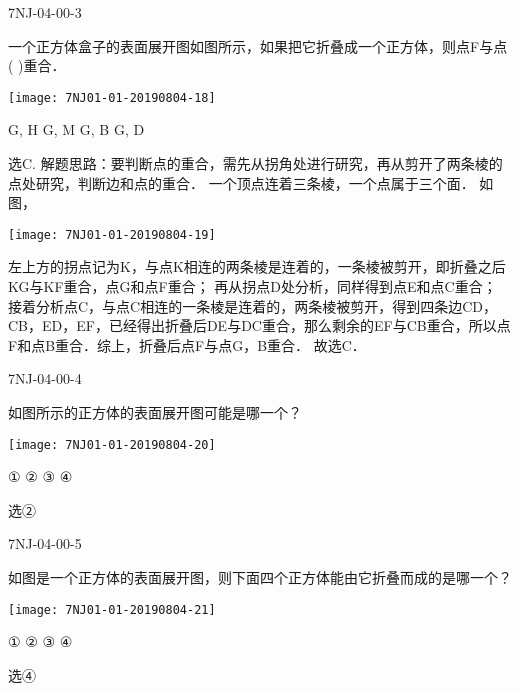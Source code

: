 \begin{defproblem}{7NJ-04-00-3}%
\begin{onlyproblem}%
一个正方体盒子的表面展开图如图所示，如果把它折叠成一个正方体，则点F与点(    )重合． 
\begin{center}
\texttt{[image: 7NJ01-01-20190804-18]}
\end{center}

\xx
{G, H}
{G, M}
{G, B}
{G, D}


\end{onlyproblem}%
\begin{onlysolution}%
\begin{solution}%
选C.
解题思路：要判断点的重合，需先从拐角处进行研究，再从剪开了两条棱的点处研究，判断边和点的重合． 一个顶点连着三条棱，一个点属于三个面． 如图， 
\begin{center}
\texttt{[image: 7NJ01-01-20190804-19]}
\end{center}

  左上方的拐点记为K，与点K相连的两条棱是连着的，一条棱被剪开，即折叠之后KG与KF重合，点G和点F重合； 再从拐点D处分析，同样得到点E和点C重合； 接着分析点C，与点C相连的一条棱是连着的，两条棱被剪开，得到四条边CD，CB，ED，EF，已经得出折叠后DE与DC重合，那么剩余的EF与CB重合，所以点F和点B重合．综上，折叠后点F与点G，B重合． 故选C． 
\end{solution}%
\end{onlysolution}%
\end{defproblem}


\begin{defproblem}{7NJ-04-00-4}%
\begin{onlyproblem}%
如图所示的正方体的表面展开图可能是哪一个？ 
\begin{center}
\texttt{[image: 7NJ01-01-20190804-20]}
\end{center}

\xx
{①}
{②}
{③}
{④}


\end{onlyproblem}%
\begin{onlysolution}%
\begin{solution}%
选②
\end{solution}%
\end{onlysolution}%
\end{defproblem}


\begin{defproblem}{7NJ-04-00-5}%
\begin{onlyproblem}%
如图是一个正方体的表面展开图，则下面四个正方体能由它折叠而成的是哪一个？ 
\begin{center}
\texttt{[image: 7NJ01-01-20190804-21]}
\end{center}

\xx
{①}
{②}
{③}
{④}


\end{onlyproblem}%
\begin{onlysolution}%
\begin{solution}%
选④
\end{solution}%
\end{onlysolution}%
\end{defproblem}


